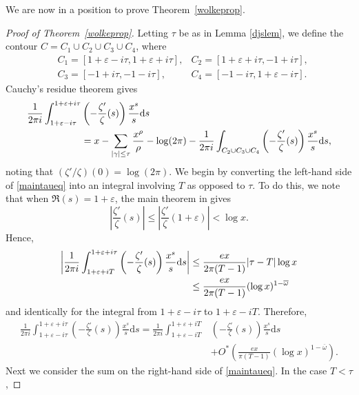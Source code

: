 \documentclass[reqno]{amsart}
\numberwithin{equation}{section}
\theoremstyle{remark}
\begin{document}
We are now in a position to prove Theorem~\ref{wolkeprop}.
\begin{proof}[Proof of Theorem~\ref{wolkeprop}]
Letting $\tau$ be as in Lemma \ref{djslem}, we define the contour $C=C_1\cup C_2\cup C_3\cup C_4$, where
\begin{align*}
    &C_1=[1+\varepsilon-i\tau,1+\varepsilon+i\tau], &C_2=[1+\varepsilon+i\tau,-1+i\tau],\\
    &C_3=[-1+i\tau,-1-i\tau], &C_4=[-1-i\tau,1+\varepsilon-i\tau].
\end{align*}
Cauchy's residue theorem gives
\begin{align}\label{maintaueq}
    \frac{1}{2\pi i}\int_{1+\varepsilon-i\tau}^{1+\varepsilon+i\tau}&\left(-\frac{\zeta'}{\zeta}(s)\right)\frac{x^s}{s}\mathrm{d}s\notag\\
    &=x-\sum_{|\gamma|\leq\tau}\frac{x^\rho}{\rho}-\log(2\pi)-\frac{1}{2\pi i}\int_{C_2\cup C_3\cup C_4}\left(-\frac{\zeta'}{\zeta}(s)\right)\frac{x^s}{s}\mathrm{d}s,
\end{align}
noting that $(\zeta'/\zeta)(0)=\log(2\pi)$. We begin by converting the left-hand side of \eqref{maintaueq} into an integral involving $T$ as opposed to $\tau$. To do this, we note that when $\Re(s)=1+\varepsilon$, the main theorem in \cite{Delange_87} gives
\begin{equation*}
    \left|\frac{\zeta'}{\zeta}(s)\right|\leq\left|\frac{\zeta'}{\zeta}(1+\varepsilon)\right|<\log x.
\end{equation*}
Hence,
\begin{align}\label{deltaterm}
    \left|\frac{1}{2\pi i}\int_{1+\varepsilon+iT}^{1+\varepsilon+i\tau}\left(-\frac{\zeta'}{\zeta}(s)\right)\frac{x^s}{s}\mathrm{d}s\right|&\leq\frac{ex}{2\pi (T-1)}|\tau-T|\log x \notag\\
    &\leq\frac{ex}{2\pi (T-1)}(\log x)^{1-\overline{\omega}}
\end{align}
and identically for the integral from $1+\varepsilon-i\tau$ to $1+\varepsilon-iT$. Therefore,
\begin{align*}
    \frac{1}{2\pi i}\int_{1+\varepsilon-i\tau}^{1+\varepsilon+i\tau}\left(-\frac{\zeta'}{\zeta}(s)\right)\frac{x^s}{s}\mathrm{d}s=\frac{1}{2\pi i}\int_{1+\varepsilon-iT}^{1+\varepsilon+iT}&\left(-\frac{\zeta'}{\zeta}(s)\right)\frac{x^s}{s}\mathrm{d}s\\
    &+O^*\left(\frac{ex}{\pi(T-1)}(\log x)^{1-\overline{\omega}}\right).
\end{align*}
Next we consider the sum on the right-hand side of \eqref{maintaueq}. In the case $T<\tau$,

\end{proof}
\end{document}
